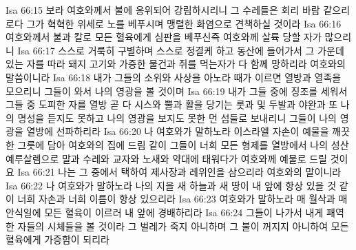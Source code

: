 Isa 66:15  보라 여호와께서 불에 옹위되어 강림하시리니 그 수레들은 회리 바람 같으리로다 그가 혁혁한 위세로 노를 베푸시며 맹렬한 화염으로 견책하실 것이라
Isa 66:16  여호와께서 불과 칼로 모든 혈육에게 심판을 베푸신즉 여호와께 살륙 당할 자가 많으리니
Isa 66:17  스스로 거룩히 구별하며 스스로 정결케 하고 동산에 들어가서 그 가운데 있는 자를 따라 돼지 고기와 가증한 물건과 쥐를 먹는자가 다 함께 망하리라 여호와의 말씀이니라
Isa 66:18  내가 그들의 소위와 사상을 아노라 때가 이르면 열방과 열족을 모으리니 그들이 와서 나의 영광을 볼 것이며
Isa 66:19  내가 그들 중에 징조를 세워서 그들 중 도피한 자를 열방 곧 다 시스와 뿔과 활을 당기는 룻과 및 두발과 야완과 또 나의 명성을 듣지도 못하고 나의 영광을 보지도 못한 먼 섬들로 보내리니 그들이 나의 영광을 열방에 선파하리라
Isa 66:20  나 여호와가 말하노라 이스라엘 자손이 예물을 깨끗한 그릇에 담아 여호와의 집에 드림 같이 그들이 너희 모든 형제를 열방에서 나의 성산 예루살렘으로 말과 수레와 교자와 노새와 약대에 태워다가 여호와께 예물로 드릴 것이요
Isa 66:21  나는 그 중에서 택하여 제사장과 레위인을 삼으리라 여호와의 말이니라
Isa 66:22  나 여호와가 말하노라 나의 지을 새 하늘과 새 땅이 내 앞에 항상 있을 것 같이 너희 자손과 너희 이름이 항상 있으리라
Isa 66:23  여호와가 말하노라 매 월삭과 매 안식일에 모든 혈육이 이르러 내 앞에 경배하리라
Isa 66:24  그들이 나가서 내게 패역한 자들의 시체들을 볼 것이라 그 벌레가 죽지 아니하며 그 불이 꺼지지 아니하여 모든 혈육에게 가증함이 되리라


